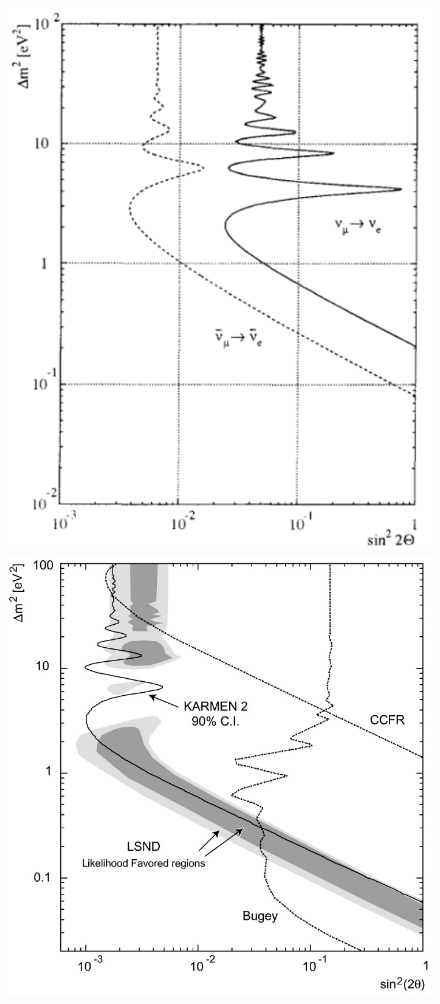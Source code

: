 \begin{figure}[h!]
    \centering
    \includegraphics[width = \smallfigwidth, height = \smallfigwidth]{figures-chap2/karmen_contours.png}
    \includegraphics[width = \smallfigwidth, height = \smallfigwidth]{figures-chap2/karmen_contours_2.png}

\end{figure}
